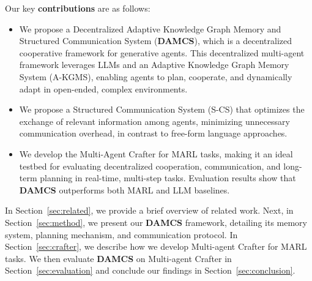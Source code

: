 Our key \textbf{contributions} are as follows:
\begin{itemize}
    \item We propose a Decentralized Adaptive Knowledge Graph Memory and Structured Communication System (\textbf{DAMCS}), which is a decentralized cooperative framework for generative agents. This decentralized multi-agent framework leverages LLMs and an Adaptive Knowledge Graph Memory System (A-KGMS), enabling agents to plan, cooperate, and dynamically adapt in open-ended, complex environments.
    
    \item We propose a Structured Communication System (S-CS) that optimizes the exchange of relevant information among agents, minimizing unnecessary communication overhead, in contrast to free-form language approaches.
    
    
    \item We develop the Multi-Agent Crafter for MARL tasks, making it an ideal testbed for evaluating decentralized cooperation, communication, and long-term planning in real-time, multi-step tasks. Evaluation results show that \textbf{DAMCS} outperforms both MARL and LLM baselines.
    
\end{itemize}
In Section~\ref{sec:related}, we provide a brief overview of related work. Next, in Section~\ref{sec:method}, we present our \textbf{DAMCS} framework, detailing its memory system, planning mechanism, and communication protocol. In Section~\ref{sec:crafter}, we describe how we develop Multi-agent Crafter for MARL tasks. We then evaluate \textbf{DAMCS} on Multi-agent Crafter in Section~\ref{sec:evaluation} and conclude our findings in Section~\ref{sec:conclusion}.





